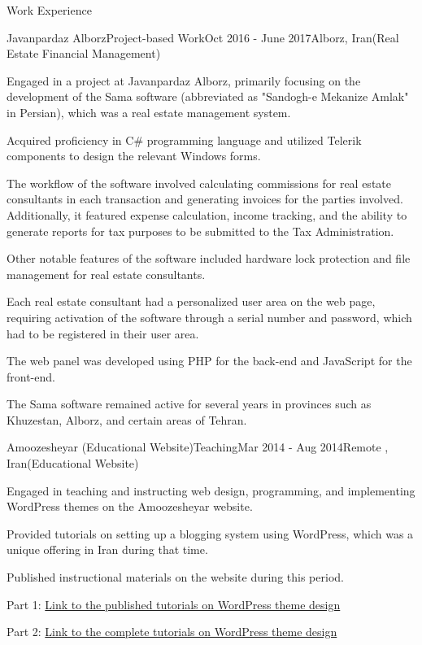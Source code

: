\documentclass[]{kyvernitis-resume}
\begin{document}
\begin{section}{Work Experience}
    \begin{subsection}{Javanpardaz Alborz}{Project-based Work}{Oct 2016 - June 2017}{Alborz, Iran}{(Real Estate Financial Management)}
	\item Engaged in a project at Javanpardaz Alborz, primarily focusing on the development of the Sama software (abbreviated as "Sandogh-e Mekanize Amlak" in Persian), which was a real estate management system.
	\item Acquired proficiency in C\# programming language and utilized Telerik components to design the relevant Windows forms.
	\item The workflow of the software involved calculating commissions for real estate consultants in each transaction and generating invoices for the parties involved. Additionally, it featured expense calculation, income tracking, and the ability to generate reports for tax purposes to be submitted to the Tax Administration.
	\item Other notable features of the software included hardware lock protection and file management for real estate consultants.
	\item Each real estate consultant had a personalized user area on the web page, requiring activation of the software through a serial number and password, which had to be registered in their user area.
	\item The web panel was developed using PHP for the back-end and JavaScript for the front-end.
	\item The Sama software remained active for several years in provinces such as Khuzestan, Alborz, and certain areas of Tehran.
    \end{subsection}


 \begin{subsection}{Amoozesheyar (Educational Website)}{Teaching}{Mar 2014 - Aug 2014}{Remote , Iran}{(Educational Website)}
	\item Engaged in teaching and instructing web design, programming, and implementing WordPress themes on the Amoozesheyar website.
	\item Provided tutorials on setting up a blogging system using WordPress, which was a unique offering in Iran during that time.
	\item Published instructional materials on the website during this period.
	\item Part 1:  \href{https://www.daneshjooyar.com/%d9%82%d8%b3%d9%85%d8%aa-%d9%86%d9%87%d8%a7%db%8c%db%8c-%d8%b3%d8%b1%db%8c-%d8%a2%d9%85%d9%88%d8%b2%d8%b4%db%8c-%d8%b7%d8%b1%d8%a7%d8%ad%db%8c-%d9%82%d8%a7%d9%84%d8%a8-%d9%88%d8%b1%d8%af%d9%be%d8%b1/}{Link to the published tutorials on WordPress theme design} 
	\item Part 2: \href{https://www.daneshjooyar.com/%d8%a2%d9%85%d9%88%d8%b2%d8%b4-%d8%b7%d8%b1%d8%a7%d8%ad%db%8c-%d9%82%d8%a7%d9%84%d8%a8-%d9%88%d8%b1%d8%af%d9%be%d8%b1%d8%b3-%d8%aa%d9%85%d8%a7%d9%85%db%8c-%d9%82%d8%b3%d9%85%d8%aa-%d9%87%d8%a7-%d9%82/}{Link to the complete tutorials on WordPress theme design}
    \end{subsection}
    
\end{section}
\end{document}
